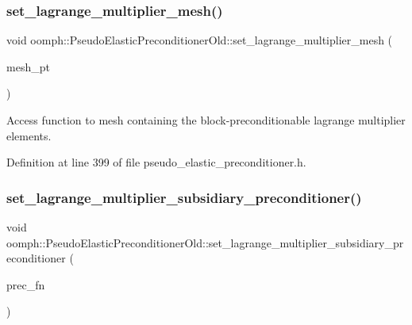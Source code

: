 \subsubsection{\texorpdfstring{set\+\_\+lagrange\+\_\+multiplier\+\_\+mesh()}{set\_lagrange\_multiplier\_mesh()}}
{\footnotesize\ttfamily void oomph\+::\+Pseudo\+Elastic\+Preconditioner\+Old\+::set\+\_\+lagrange\+\_\+multiplier\+\_\+mesh (\begin{DoxyParamCaption}\item[{\hyperlink{classoomph_1_1Mesh}{Mesh} $\ast$}]{mesh\+\_\+pt }\end{DoxyParamCaption})\hspace{0.3cm}{\ttfamily [inline]}}



Access function to mesh containing the block-\/preconditionable lagrange multiplier elements. 



Definition at line 399 of file pseudo\+\_\+elastic\+\_\+preconditioner.\+h.

\mbox{\label{classoomph_1_1PseudoElasticPreconditionerOld_ab0f5cd103d172fcb33be52c17bb741d3}} 
\subsubsection{\texorpdfstring{set\+\_\+lagrange\+\_\+multiplier\+\_\+subsidiary\+\_\+preconditioner()}{set\_lagrange\_multiplier\_subsidiary\_preconditioner()}}
{\footnotesize\ttfamily void oomph\+::\+Pseudo\+Elastic\+Preconditioner\+Old\+::set\+\_\+lagrange\+\_\+multiplier\+\_\+subsidiary\+\_\+preconditioner (\begin{DoxyParamCaption}\item[{\hyperlink{classoomph_1_1PseudoElasticPreconditionerOld_a8ee80a4a55139190a6e2a16fa175e75f}{Subsidiary\+Preconditioner\+Fct\+Pt}}]{prec\+\_\+fn }\end{DoxyParamCaption})\hspace{0.3cm}{\ttfamily [inline]}}



